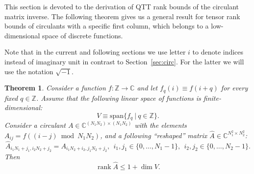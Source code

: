 \documentclass[a4paper]{article}
\newtheorem{theorem}{Theorem}[section]
\DeclareMathOperator{\rank}{rank}
\begin{document}
This section is devoted to the derivation of QTT rank bounds of the circulant  matrix inverse.
The following theorem gives us a general result for tensor rank bounds of circulants with a specific first column, which belongs to a low-dimensional space of discrete functions.

Note that in the current and following sections we use letter $i$ to denote indices instead of  imaginary unit in contrast to Section~\ref{sec:circ}. 
For the latter we will use the notation $\sqrt{-1}$.

	\begin{theorem}\label{thm:qtt-rank-general}
		Consider a function $f: \mathbb{Z} \to \mathbb{C}$ and let $f_q(i) \equiv f(i+q)$ for every fixed $q \in \mathbb{Z}$.
 		Assume that the following linear space of functions is finite-dimensional:
		\[
		V \equiv \mathrm{span}\{f_q~|~q \in \mathbb{Z}\}.
		\]
		Consider a circulant $A \in \mathbb{C}^{(N_1N_2) \times (N_1N_2)}$ with the elements $A_{ij} = f((i-j) \bmod N_1N_2)$, and a following ``reshaped'' matrix $\widehat{A} \in \mathbb{C}^{N_1^2 \times N_2^2}$:
		\[
		\widehat{A}_{i_1N_1 + j_1, i_2N_2 + j_2} = A_{i_1N_2 + i_2,j_1N_2 + j_2},~~ i_1, j_1 \in \{0, \dots, N_1-1\},~~i_2, j_2 \in \{0, \dots, N_2-1\}.
		\]
		Then
		\[
		\rank \widehat{A} \le 1 + \dim V.
		\]
	\end{theorem}
\end{document}
